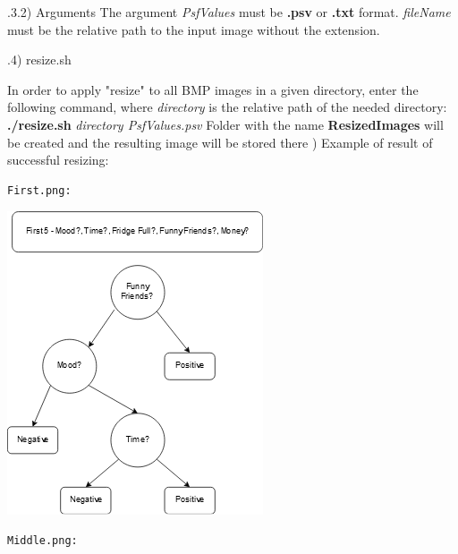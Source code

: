 \documentclass{article}
\begin{document}
.3.2) Arguments
The argument \textit{PsfValues} must be \textbf{.psv} or \textbf{.txt} format. \textit{fileName} must be the relative path to the input image without the extension.

.4) resize.sh

In order to apply "resize" to all BMP images in a given directory, enter the following command, where \textit{directory} is the relative path of the needed directory:\newline
\indent \textbf{./resize.sh }\textit{directory PsfValues.psv}  
Folder with the name \textbf{ResizedImages} will be created and the resulting image will be stored there
) Example of result of successful resizing:

\parindent=0cm

\begin{minipage}{0.5\textwidth}
\begin{verbatim}
First.png:
\end{verbatim}
\begin{center}
\includegraphics[scale=1]{First.png}
\end{center}
\end{minipage}
\begin{minipage}{0.5\textwidth}
\begin{verbatim}
Middle.png:
\end{verbatim}
\end{minipage}
\parindent=1.5cm
\newline
\newline
\newline
\end{document}
